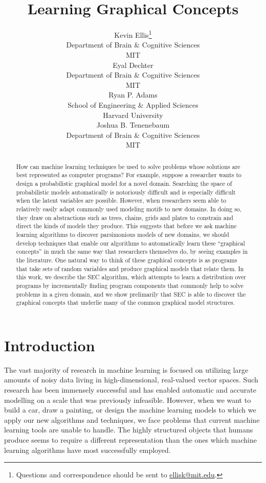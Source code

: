 \documentclass{article} %
\title{Learning Graphical Concepts}
\author{
Kevin Ellis\thanks{Questions and correspondence should be sent to 
\href{mailto:ellisk@mit.edu}{ellisk@mit.edu}.} \\
Department of Brain \& Cognitive Sciences\\
MIT\\
\And
Eyal Dechter \\
Department of Brain \& Cognitive Sciences\\
MIT\\
\AND
Ryan P. Adams \\
School of Engineering \& Applied Sciences \\
Harvard University\\
\And
Joshua B. Tenenebaum \\
Department of Brain \& Cognitive Sciences\\
MIT\\
}
\begin{document}
\maketitle

\begin{abstract}
How can machine learning techniques be used to solve problems whose solutions are best represented as computer programs? For example, suppose a researcher wants to design a probabilistic graphical model for a novel domain. Searching the space of probabilistic models automatically is notoriously difficult and is especially difficult when the latent variables are possible. However, when researchers seem able to relatively easily adapt commonly used modeling motifs to new domains. In doing so, they draw on abstractions such as trees, chains, grids and plates to constrain and direct the kinds of models they produce. This suggests that before we ask machine learning algorithms to discover parsimonious models of new domains, we should develop techniques that enable our algorithms to automatically learn these ``graphical concepts'' in much the same way that researchers themselves do, by seeing examples in the literature. One natural way to think of these graphical concepts is as programs that take sets of random variables and produce graphical models that relate them. In this work, we describe the SEC algorithm, which attempts to learn a distribution over programs by incrementally finding program components that commonly help to solve problems in a given domain, and we show prelimarily that SEC is able to discover the graphical concepts that underlie many of the common graphical model structures.  
\end{abstract}


\section{Introduction}


The vast majority of research in machine learning is focused on utilizing large amounts of noisy data living in high-dimensional, real-valued vector spaces. Such research has been immensely successful and has enabled automatic and accurate modelling on a scale that was previously infeasible. However, when we want to build a car, draw a painting, or design the machine learning models to which we apply our new algorithms and techniques, we face problems that current machine learning tools are unable to handle. The highly structured objects that humans produce seems to require a different representation than the ones which machine learning algorithms have most successfully employed. 
\end{document}
